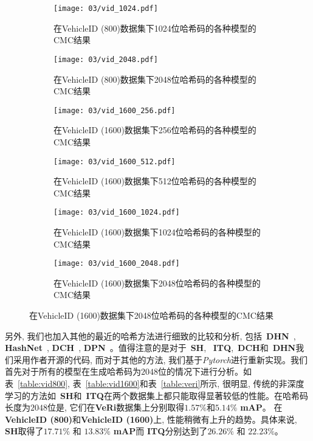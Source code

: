 \begin{figure}[!htp]\ContinuedFloat
  \begin{subfigure}{0.45\textwidth}
    \centering
    \texttt{[image: 03/vid\_1024.pdf]}
    \caption{在VehicleID (800)数据集下1024位哈希码的各种模型的CMC结果}
  \end{subfigure}
  \hspace{1cm}
  \begin{subfigure}{0.45\textwidth}
    \centering
    \texttt{[image: 03/vid\_2048.pdf]}
    \caption{在VehicleID (800)数据集下2048位哈希码的各种模型的CMC结果}
  \end{subfigure}
  \begin{subfigure}{0.45\textwidth}
    \centering
    \texttt{[image: 03/vid\_1600\_256.pdf]}
    \caption{在VehicleID (1600)数据集下256位哈希码的各种模型的CMC结果}
  \end{subfigure}
  \hspace{1cm}
  \begin{subfigure}{0.45\textwidth}
    \centering
    \texttt{[image: 03/vid\_1600\_512.pdf]}
    \caption{在VehicleID (1600)数据集下512位哈希码的各种模型的CMC结果}
  \end{subfigure}
  \begin{subfigure}{0.45\textwidth}
    \centering
    \texttt{[image: 03/vid\_1600\_1024.pdf]}
    \caption{在VehicleID (1600)数据集下1024位哈希码的各种模型的CMC结果}
  \end{subfigure}
  \hspace{1cm}
  \begin{subfigure}{0.45\textwidth}
    \centering
    \texttt{[image: 03/vid\_1600\_2048.pdf]}
    \caption{在VehicleID (1600)数据集下2048位哈希码的各种模型的CMC结果}
  \end{subfigure}
 
  \label{fig:vehashresults}
\end{figure}
另外, 我们也加入其他的最近的哈希方法进行细致的比较和分析, 包括~\textbf{DHN}~\cite{zhu2016deep}, \textbf{HashNet}~\cite{cao2017hashnet}, \textbf{DCH}~\cite{cao2018deep}, \textbf{DPN}~\cite{fan2020deep}。值得注意的是对于~\textbf{SH}, ~\textbf{ITQ},~\textbf{DCH}和~\textbf{DHN}我们采用作者开源的代码, 而对于其他的方法, 我们基于\textit{Pytorch}进行重新实现。我们首先对于所有的模型在生成哈希码为$2048$位的情况下进行分析。如表~\ref{table:vid800}, 表~\ref{table:vid1600}和表~\ref{table:veri}所示, 很明显, 传统的非深度学习的方法如~\textbf{SH}和~\textbf{ITQ}在两个数据集上都只能取得显著较低的性能。在哈希码长度为$2048$位是, 它们在\textbf{VeRi}数据集上分别取得$1.57\%$和$5.14\%$ \textbf{mAP}。 在\textbf{VehicleID (800)}和\textbf{VehicleID (1600)}上, 性能稍微有上升的趋势。具体来说, \textbf{SH}取得了$17.71 \%$ 和 $13.83 \%$ \textbf{mAP}而 \textbf{ITQ}分别达到了$26.26 \%$ 和 $22.23\%$。
